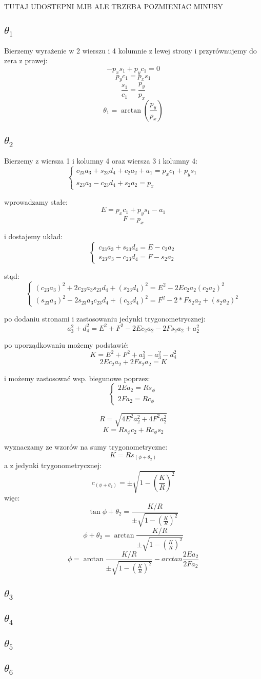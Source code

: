 \documentclass[]{article}
\begin{document}
TUTAJ UDOSTEPNI MJB ALE TRZEBA POZMIENIAC MINUSY
\subsection{$\theta_1$}
Bierzemy wyrażenie w 2 wierszu i 4 kolumnie z lewej strony i przyrównujemy do zera z prawej:
\[ -p_xs_1 + p_yc_1 = 0 \]
\[ p_yc_1 = p_xs_1 \]
\[ \frac{s_1}{c_1} = \frac{p_y}{p_x} \]
\[ \theta_1 = \arctan(\frac{p_y}{p_x})\]
\subsection{$\theta_2$}
Bierzemy z wiersza 1 i kolumny 4 oraz wiersza 3 i kolumny 4:
\[ \left\{\begin{array}{c}
c_{23}a_3 + s_{23}d_4 + c_2a_2 + a_1 = p_x c_1 + p_y s_1 \\
s_{23}a_3 - c_{23}d_4+s_2a_2 = p_x 
\end{array} \right. \]

wprowadzamy stałe:
\[ E = p_xc_1 + p_ys_1 -a_1\]
\[F = p_x\]

i dostajemy układ:
\[ \left\{\begin{array}{c}
c_{23}a_3 + s_{23}d_4 = E - c_2a_2\\
s_{23}a_3 - c_{23}d_4 = F - s_2a_2 
\end{array} \right. \]

stąd:
\[ \left\{\begin{array}{c}
(c_{23}a_3)^2 + 2c_{23}a_3s_{23}d_4 + (s_{23}d_4)^2 = E^2 -2Ec_2a_2 (c_2a_2)^2 \\
(s_{23}a_3)^2 -2s_{23}a_3c_{23}d_4 + (c_{23}d_4)^2 = F^2 - 2*Fs_2a_2 + (s_2a_2)^2 
\end{array} \right. \]

po dodaniu stronami i zastosowaniu jedynki trygonometrycznej:
\[ a_3^2 + d_4^2 = E^2 + F^2 -2Ec_2a_2 - 2Fs_2a_2 + a_2^2 \]

po uporządkowaniu możemy podstawić:
\[ K = E^2 + F^2 + a_2^2 - a_3^2 - d_4^2 \]
\[2Ec_2a_2 + 2Fs_2a_2 = K \]

i możemy zastosować wsp. biegunowe poprzez:
\[ \left\{\begin{array}{c}
2Ea_2 = Rs_\phi \\
2Fa_2 = Rc_\phi
\end{array} \right. \]

\[ R = \sqrt{4E^2a_2^2 + 4F^2a_2^2} \]
\[ K = Rs_\phi c_2 + Rc_\phi s_2 \]

wyznaczamy ze wzorów na sumy trygonometryczne:
\[ K = Rs_{(\phi + \theta_2)} \]
a z jedynki trygonometrycznej:
\[ c_{(\phi + \theta_2)} = \pm\sqrt{1-(\frac{K}{R})^2} \]
więc:
\[ \tan{\phi + \theta_2}  = \frac{K/R}{\pm \sqrt{1-(\frac{K}{R})^2}}\]
\[ \phi + \theta_2  = \arctan{\frac{K/R}{\pm \sqrt{1-(\frac{K}{R})^2}}}\]
\[ \phi  = \arctan{\frac{K/R}{\pm \sqrt{1-(\frac{K}{R})^2}}} - arctan{\frac{2Ea_2}{2Fa_2}}\]
\subsection{$\theta_3$}
\subsection{$\theta_4$}
\subsection{$\theta_5$}
\subsection{$\theta_6$}
\end{document}
